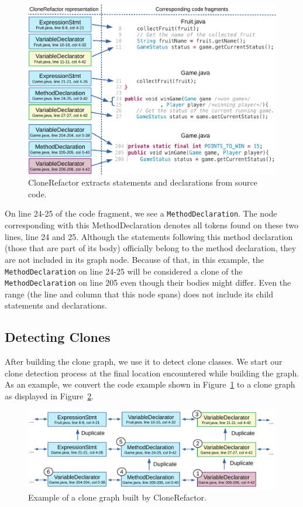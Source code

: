\begin{figure}[H]
  \centering
  \includegraphics[width=1\columnwidth]{img/CloneGraphCode}
  \caption{CloneRefactor extracts statements and declarations from source code.}
  \label{fig:clonegraph}
\end{figure}

On line 24-25 of the code fragment, we see a \texttt{MethodDeclaration}. The node corresponding with this MethodDeclaration denotes all tokens found on these two lines, line 24 and 25. Although the statements following this method declaration (those that are part of its body) officially belong to the method declaration, they are not included in its graph node. Because of that, in this example, the \texttt{MethodDeclaration} on line 24-25 will be considered a clone of the \texttt{MethodDeclaration} on line 205 even though their bodies might differ. Even the range (the line and column that this node spans) does not include its child statements and declarations.

\subsection{Detecting Clones} \label{sec:detectingclones}
After building the clone graph, we use it to detect clone classes. We start our clone detection process at the final location encountered while building the graph. As an example, we convert the code example shown in Figure~\ref{fig:clonegraph} to a clone graph as displayed in Figure~\ref{fig:clonegraph2}.

\begin{figure}[H]
  \centering
  \includegraphics[width=1\columnwidth]{img/CodeGraphExample}
  \caption{Example of a clone graph built by CloneRefactor.}
  \label{fig:clonegraph2}
\end{figure}

